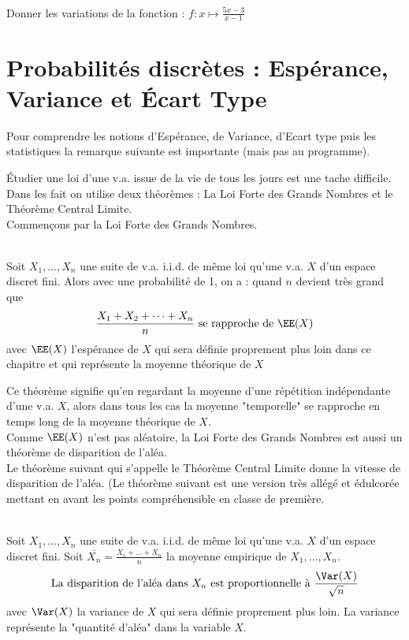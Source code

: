 \documentclass[12pt,fleqn]{report} %
\begin{document}
\begin{exercise}\label{Exercice 41}\text{ }\\
	Donner les variations de  la fonction : $f : x \mapsto \frac{5x-3}{x-1}$
\end{exercise}



\setcounter{chapter}{8}
\chapter{Probabilités discrètes : Espérance, Variance et Écart Type}

Pour comprendre les notions d'Espérance, de Variance, d'Ecart type puis les statistiques la remarque suivante est importante (mais pas au programme).
\begin{remark}
	Étudier une loi d'une v.a. issue de la vie de tous les jours est une tache difficile. Dans les fait on utilise deux théorèmes : La Loi Forte des Grands Nombres et le Théorème Central Limite.\\
	Commençons par la Loi Forte des Grands Nombres.
	\begin{theorem}\text{ }\\
		Soit $X_1,\dots,X_n$ une suite de v.a. i.i.d. de même loi qu'une v.a. $X$ d'un espace discret fini.
		Alors avec une probabilité de 1, on a : quand $n$ devient très grand que 
		\[
		\frac{X_1 + X_2 + \dots + X_n}{n} \text{ se rapproche de } \EE(X)
		\]
		avec $\EE(X)$ l'espérance de $X$ qui sera définie proprement plus loin dans ce chapitre et qui représente la moyenne théorique de $X$
	\end{theorem}
	Ce théorème signifie qu'en regardant la moyenne d'une répétition indépendante d'une v.a. $X$, alors dans tous les cas la moyenne "temporelle" se rapproche en temps long de la moyenne théorique de $X$. \\ 
	
	Comme $\EE(X)$ n'est pas aléatoire, la Loi Forte des Grands Nombres est aussi un théorème de disparition de l'aléa. \\
	Le théorème suivant qui s'appelle le Théorème Central Limite donne la vitesse de disparition de l'aléa. (Le théorème suivant est une version très allégé et édulcorée mettant en avant les points compréhensible en classe de première.
	\begin{theorem}\text{ }\\
		Soit $X_1,\dots,X_n$ une suite de v.a. i.i.d. de même loi qu'une v.a. $X$ d'un espace discret fini. Soit $\overline{X_n} = \frac{X_1 +  \dots + X_n}{n}$ la moyenne empirique de $X_1, \dots, X_n$. \\
		\[ \text{La disparition de l'aléa dans $X_n$ est proportionnelle à } \frac{\Var(X)}{\sqrt{n}}\] avec $\Var(X)$ la variance de $X$ qui sera définie proprement plus loin. La variance représente la "quantité d'aléa" dans la variable $X$.
	\end{theorem}
\end{remark}
\end{document}
